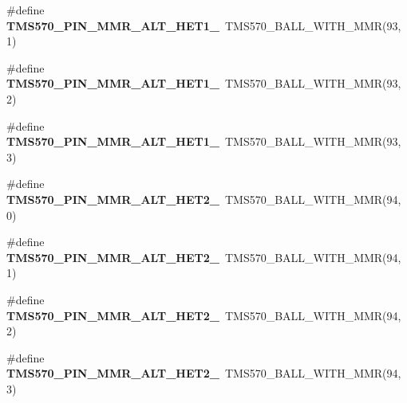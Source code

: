 \begin{DoxyCompactItemize}
\item 
\mbox{\label{tms570lc4357-pins_8h_ab56a2e9c34cc4261f1db9b2840c794a8}} 
\#define {\bfseries T\+M\+S570\+\_\+\+P\+I\+N\+\_\+\+M\+M\+R\+\_\+\+A\+L\+T\+\_\+\+H\+E\+T1\+\_}~T\+M\+S570\+\_\+\+B\+A\+L\+L\+\_\+\+W\+I\+T\+H\+\_\+\+M\+MR(93, 1)
\item 
\mbox{\label{tms570lc4357-pins_8h_a2266b89a433649acecbeef9b96248a50}} 
\#define {\bfseries T\+M\+S570\+\_\+\+P\+I\+N\+\_\+\+M\+M\+R\+\_\+\+A\+L\+T\+\_\+\+H\+E\+T1\+\_}~T\+M\+S570\+\_\+\+B\+A\+L\+L\+\_\+\+W\+I\+T\+H\+\_\+\+M\+MR(93, 2)
\item 
\mbox{\label{tms570lc4357-pins_8h_adb5fb01506354fe7a49bff57ee3b2409}} 
\#define {\bfseries T\+M\+S570\+\_\+\+P\+I\+N\+\_\+\+M\+M\+R\+\_\+\+A\+L\+T\+\_\+\+H\+E\+T1\+\_}~T\+M\+S570\+\_\+\+B\+A\+L\+L\+\_\+\+W\+I\+T\+H\+\_\+\+M\+MR(93, 3)
\item 
\mbox{\label{tms570lc4357-pins_8h_ae45b49a916e58843395da23942050545}} 
\#define {\bfseries T\+M\+S570\+\_\+\+P\+I\+N\+\_\+\+M\+M\+R\+\_\+\+A\+L\+T\+\_\+\+H\+E\+T2\+\_}~T\+M\+S570\+\_\+\+B\+A\+L\+L\+\_\+\+W\+I\+T\+H\+\_\+\+M\+MR(94, 0)
\item 
\mbox{\label{tms570lc4357-pins_8h_ad08c0b3826938df87daea9535abef444}} 
\#define {\bfseries T\+M\+S570\+\_\+\+P\+I\+N\+\_\+\+M\+M\+R\+\_\+\+A\+L\+T\+\_\+\+H\+E\+T2\+\_}~T\+M\+S570\+\_\+\+B\+A\+L\+L\+\_\+\+W\+I\+T\+H\+\_\+\+M\+MR(94, 1)
\item 
\mbox{\label{tms570lc4357-pins_8h_abfae2f0a0970513677522a81b9c70c0e}} 
\#define {\bfseries T\+M\+S570\+\_\+\+P\+I\+N\+\_\+\+M\+M\+R\+\_\+\+A\+L\+T\+\_\+\+H\+E\+T2\+\_}~T\+M\+S570\+\_\+\+B\+A\+L\+L\+\_\+\+W\+I\+T\+H\+\_\+\+M\+MR(94, 2)
\item 
\mbox{\label{tms570lc4357-pins_8h_a3608eb569149e7b9993d686a38384b3d}} 
\#define {\bfseries T\+M\+S570\+\_\+\+P\+I\+N\+\_\+\+M\+M\+R\+\_\+\+A\+L\+T\+\_\+\+H\+E\+T2\+\_}~T\+M\+S570\+\_\+\+B\+A\+L\+L\+\_\+\+W\+I\+T\+H\+\_\+\+M\+MR(94, 3)
\item 
\mbox{\label{tms570lc4357-pins_8h_aa599d5793b8488f13ed17a47142da874}} 

\end{DoxyCompactItemize}
